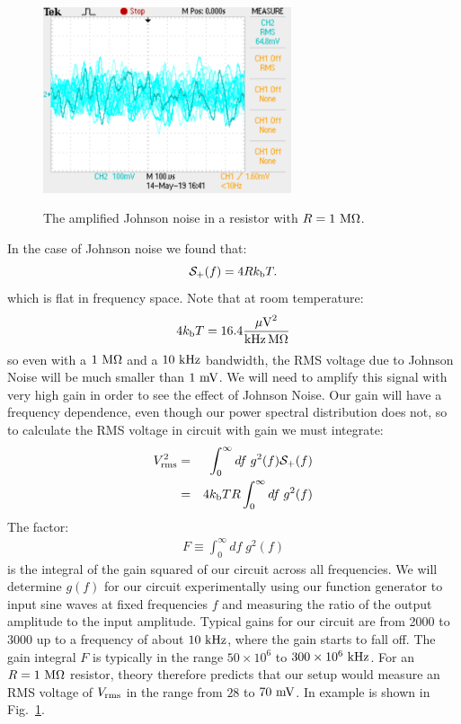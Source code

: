 \documentclass[12pt]{article}
\newcommand{\kb}{k_{\rm b}}
\begin{document}
\begin{figure}[htbp]
\begin{center}
{\includegraphics[width=0.65\textwidth]{figs/scope_1M.pdf}}
\end{center}
\caption{\label{fig:scope1m} The amplified Johnson noise in a resistor with $R=1~\rm M\Omega$.}
\end{figure}

In the case of Johnson noise we found that:
\begin{equation}
\mathcal{S}_{+}(f) = 4 R \kb T.
\end{equation}
which is flat in frequency space.  Note that at room temperature:
\begin{displaymath}
4 \kb T =  16.4 \frac{{\rm \mu V}^2}{\rm kHz \, M\Omega}
\end{displaymath}
so even with a $1~\rm M\Omega$ and a $10~\rm kHz$ bandwidth, the RMS voltage due to Johnson Noise will be much smaller than $1~\rm mV$.  We will need to amplify this signal with very high gain in order to see the effect of Johnson Noise.  Our gain will have a frequency dependence, even though our power spectral distribution does not, so to calculate the RMS voltage in circuit with gain we must integrate:
\begin{eqnarray*}
V_{\rm rms}^2  &=& \int_{0}^{\infty} df \; g^2(f) \mathcal{S}_+(f)\\
&=& 4 \kb T R \int_{0}^{\infty} df \; g^2(f)
\end{eqnarray*}
The factor:
\begin{eqnarray*}
F \equiv \int_{0}^{\infty} df \; g^2(f)
\end{eqnarray*}
is the integral of the gain squared of our circuit across all frequencies.  We will determine $g(f)$ for our circuit experimentally using our function generator to input sine waves at fixed frequencies $f$ and measuring the ratio of the output amplitude to the input amplitude.  Typical gains for our circuit are from 2000 to 3000 up to a frequency of about $10~\rm kHz$, where the gain starts to fall off.  The gain integral $F$ is typically in the range $50 \times 10^6$ to   $300 \times 10^6 ~\rm kHz$. 
For an $R=1~\rm M\Omega$ resistor, theory therefore predicts that our setup would measure an RMS voltage of $V_{\rm rms}$ in the range from $28$ to $70~\rm mV$.  In example is shown in Fig.~\ref{fig:scope1m}.
\end{document}
